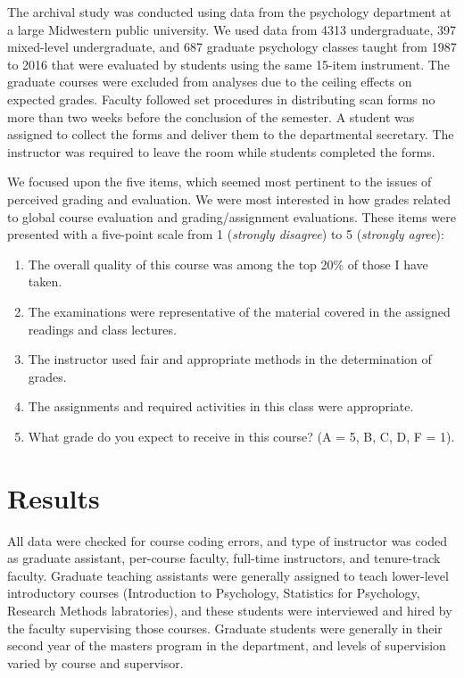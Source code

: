\documentclass[,man]{apa6}
\providecommand{\tightlist}{%
  \setlength{\itemsep}{0pt}\setlength{\parskip}{0pt}}
\theoremstyle{definition}
\theoremstyle{definition}
\theoremstyle{definition}
\theoremstyle{remark}
\begin{document}
The archival study was conducted using data from the psychology
department at a large Midwestern public university. We used data from
4313 undergraduate, 397 mixed-level undergraduate, and 687 graduate
psychology classes taught from 1987 to 2016 that were evaluated by
students using the same 15-item instrument. The graduate courses were
excluded from analyses due to the ceiling effects on expected grades.
Faculty followed set procedures in distributing scan forms no more than
two weeks before the conclusion of the semester. A student was assigned
to collect the forms and deliver them to the departmental secretary. The
instructor was required to leave the room while students completed the
forms.

We focused upon the five items, which seemed most pertinent to the
issues of perceived grading and evaluation. We were most interested in
how grades related to global course evaluation and grading/assignment
evaluations. These items were presented with a five-point scale from 1
(\emph{strongly disagree}) to 5 (\emph{strongly agree}):

\begin{enumerate}
\def\labelenumi{\arabic{enumi})}
\tightlist
\item
  The overall quality of this course was among the top 20\% of those I
  have taken.
\item
  The examinations were representative of the material covered in the
  assigned readings and class lectures.
\item
  The instructor used fair and appropriate methods in the determination
  of grades.
\item
  The assignments and required activities in this class were
  appropriate.
\item
  What grade do you expect to receive in this course? (A = 5, B, C, D, F
  = 1).
\end{enumerate}

\hypertarget{results}{%
\section{Results}\label{results}}

All data were checked for course coding errors, and type of instructor
was coded as graduate assistant, per-course faculty, full-time
instructors, and tenure-track faculty. Graduate teaching assistants were
generally assigned to teach lower-level introductory courses
(Introduction to Psychology, Statistics for Psychology, Research Methods
labratories), and these students were interviewed and hired by the
faculty supervising those courses. Graduate students were generally in
their second year of the masters program in the department, and levels
of supervision varied by course and supervisor.
\end{document}

